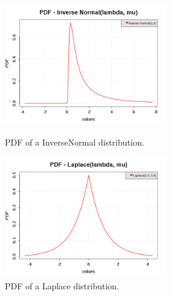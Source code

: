 \begin{figure}[H]
  \begin{minipage}{10cm}
    \begin{center}
      \includegraphics[width=7cm]{pdf_InverseNormal_2.png}
      \caption{PDF of a InverseNormal distribution.}
      \label{PDFInverseNormal2}
    \end{center}
  \end{minipage}
  \hfill
  \begin{minipage}{10cm}
    \begin{center}
      \includegraphics[width=7cm]{pdf_Laplace.png}
      \caption{PDF of a Laplace distribution.}
      \label{PDFLaplace}
    \end{center}
  \end{minipage}
\end{figure}




